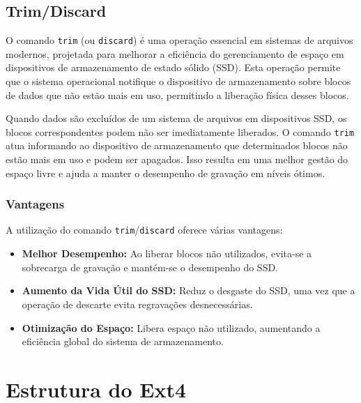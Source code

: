 \documentclass[
	12pt,				%
	openright,			%
	oneside,			%
	a4paper,			%
	chapter=TITLE,		%
	english,			%
	french,				%
	spanish,			%
	brazil				%
	]{abntex2}
\theoremstyle{definition}
\begin{document}
\section{Trim/Discard}

O comando \texttt{trim} (ou \texttt{discard}) é uma operação essencial em sistemas de arquivos modernos, projetada para melhorar a eficiência do gerenciamento de espaço em dispositivos de armazenamento de estado sólido (SSD). Esta operação permite que o sistema operacional notifique o dispositivo de armazenamento sobre blocos de dados que não estão mais em uso, permitindo a liberação física desses blocos.

Quando dados são excluídos de um sistema de arquivos em dispositivos SSD, os blocos correspondentes podem não ser imediatamente liberados. O comando \texttt{trim} atua informando ao dispositivo de armazenamento que determinados blocos não estão mais em uso e podem ser apagados. Isso resulta em uma melhor gestão do espaço livre e ajuda a manter o desempenho de gravação em níveis ótimos.

\subsection{Vantagens}
A utilização do comando \texttt{trim}/\texttt{discard} oferece várias vantagens:

\begin{itemize}
    \item \textbf{Melhor Desempenho:} Ao liberar blocos não utilizados, evita-se a sobrecarga de gravação e mantém-se o desempenho do SSD.
    
    \item \textbf{Aumento da Vida Útil do SSD:} Reduz o desgaste do SSD, uma vez que a operação de descarte evita regravações desnecessárias.
    
    \item \textbf{Otimização do Espaço:} Libera espaço não utilizado, aumentando a eficiência global do sistema de armazenamento.
\end{itemize}


\chapter{Estrutura do Ext4}
\end{document}
